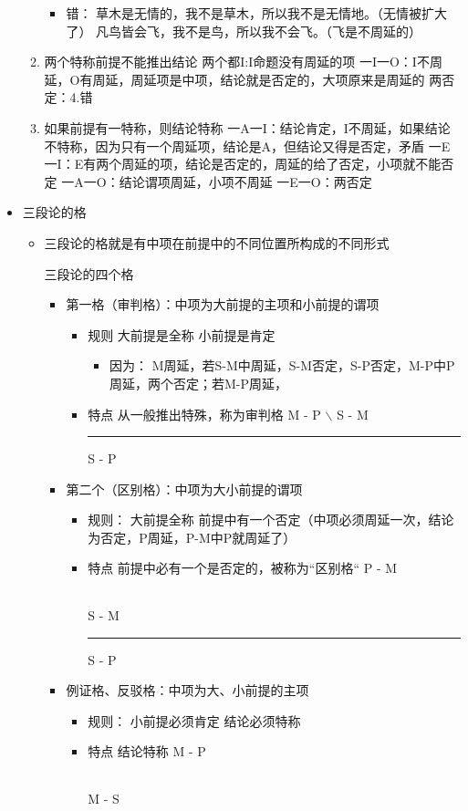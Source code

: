 \documentclass[11pt]{article}
\begin{document}
\begin{itemize}
\begin{enumerate}
\begin{itemize}
\item 错：
草木是无情的，我不是草木，所以我不是无情地。（无情被扩大了）
凡鸟皆会飞，我不是鸟，所以我不会飞。（飞是不周延的）
\end{itemize}
\item 两个特称前提不能推出结论
两个都I:I命题没有周延的项
一I一O：I不周延，O有周延，周延项是中项，结论就是否定的，大项原来是周延的
两否定：4.错
\item 如果前提有一特称，则结论特称
一A一I：结论肯定，I不周延，如果结论不特称，因为只有一个周延项，结论是A，但结论又得是否定，矛盾
一E一I：E有两个周延的项，结论是否定的，周延的给了否定，小项就不能否定
一A一O：结论谓项周延，小项不周延
一E一O：两否定
\end{enumerate}
\item 三段论的格
\begin{itemize}
\item 三段论的格就是有中项在前提中的不同位置所构成的不同形式
\item[{三段论的四个格}] \begin{itemize}
\item 第一格（审判格）：中项为大前提的主项和小前提的谓项
\begin{itemize}
\item 规则
大前提是全称
小前提是肯定
\begin{itemize}
\item 因为：
M周延，若S-M中周延，S-M否定，S-P否定，M-P中P周延，两个否定；若M-P周延，
\end{itemize}
\item 特点
从一般推出特殊，称为审判格
M - P
  $\backslash$
S - M

\rule{\linewidth}{0.5pt}
S - P
\end{itemize}
\item 第二个（区别格）：中项为大小前提的谓项
\begin{itemize}
\item 规则：
大前提全称
前提中有一个否定（中项必须周延一次，结论为否定，P周延，P-M中P就周延了）
\item 特点
前提中必有一个是否定的，被称为“区别格“
P - M
\begin{center}
\begin{tabular}{}
\\
\end{tabular}
\end{center}
S - M

\rule{\linewidth}{0.5pt}
S - P
\end{itemize}
\item 例证格、反驳格：中项为大、小前提的主项
\begin{itemize}
\item 规则：
小前提必须肯定
结论必须特称
\item 特点
结论特称
M - P
\begin{center}
\begin{tabular}{}
\\
\end{tabular}
\end{center}
M - S


\end{itemize}
\end{itemize}
\end{itemize}
\end{itemize}
\end{document}
